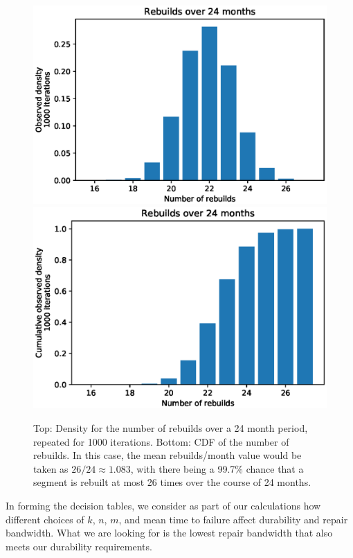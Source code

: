 \begin{figure}[!htbp]
    \centering
    \includegraphics[scale=0.5]{RS-appendix-files/example_pmf.eps}
    \includegraphics[scale=0.5]{RS-appendix-files/example_cdf.eps}
    \caption{Top: Density for the number of rebuilds over a 24 month period, repeated for 1000 iterations. Bottom: CDF of the number of rebuilds. In this case, the mean rebuilds/month value would be taken as $26/24\approx1.083$, with there being a 99.7\% chance that a segment is rebuilt at most 26 times over the course of 24 months.}
    \label{fig:sim_method}
\end{figure}

In forming the decision tables, we consider as part of our calculations how
different choices of $k$, $n$, $m$, and mean time to failure affect durability and repair bandwidth. What we are looking for is the lowest repair bandwidth that also meets our
durability requirements.





